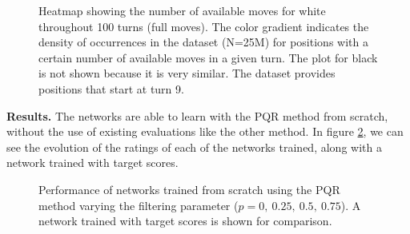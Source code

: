 \begin{figure}[H]
\centering
{}
\caption{Heatmap showing the number of available moves for white throughout 100 turns (full moves). The color gradient indicates the density of occurrences in the dataset (N=25M) for positions with a certain number of available moves in a given turn. The plot for black is not shown because it is very similar. The dataset provides positions that start at turn 9.}
\label{avg-moves}
\end{figure}

\newpage
\textbf{Results.} The networks are able to learn with the PQR method from scratch, without the use of existing evaluations like the other method. In figure \ref{pqr-evolution}, we can see the evolution of the ratings of each of the networks trained, along with a network trained with target scores.

\begin{figure}[H]
\centering
{}
\caption{Performance of networks trained from scratch using the PQR method varying the filtering parameter ($p=0,\ 0.25,\ 0.5,\ 0.75$). A network trained with target scores is shown for comparison.}
\label{pqr-evolution}
\end{figure}

